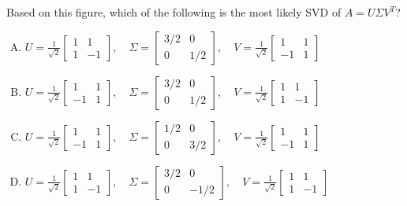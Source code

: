\documentclass[12pt]{amsart}
\begin{document}
Based on this figure, which of the following is the most likely SVD of $A = U\Sigma V^T$?

\begin{enumerate}[(A)]
\item $U = \frac{1}{\sqrt{2}}\begin{bmatrix} 1 & 1 \\ 1 & -1 \end{bmatrix}, \quad \Sigma = \begin{bmatrix} 3/2 & 0 \\ 0 & 1/2 \end{bmatrix}, \quad V = \frac{1}{\sqrt{2}}\begin{bmatrix} 1 & 1 \\ -1 & 1 \end{bmatrix}$

\item $U = \frac{1}{\sqrt{2}}\begin{bmatrix} 1 & 1 \\ -1 & 1 \end{bmatrix}, \quad \Sigma = \begin{bmatrix} 3/2 & 0 \\ 0 & 1/2 \end{bmatrix}, \quad V = \frac{1}{\sqrt{2}}\begin{bmatrix} 1 & 1 \\ 1 & -1 \end{bmatrix}$

\item $U = \frac{1}{\sqrt{2}}\begin{bmatrix} 1 & 1 \\ -1 & 1 \end{bmatrix}, \quad \Sigma = \begin{bmatrix} 1/2 & 0 \\ 0 & 3/2 \end{bmatrix}, \quad V = \frac{1}{\sqrt{2}}\begin{bmatrix} 1 & 1 \\ -1 & 1 \end{bmatrix}$

\item $U = \frac{1}{\sqrt{2}}\begin{bmatrix} 1 & 1 \\ 1 & -1 \end{bmatrix}, \quad \Sigma = \begin{bmatrix} 3/2 & 0 \\ 0 & -1/2 \end{bmatrix}, \quad V = \frac{1}{\sqrt{2}}\begin{bmatrix} 1 & 1 \\ 1 & -1 \end{bmatrix}$


\end{enumerate}
\end{document}
